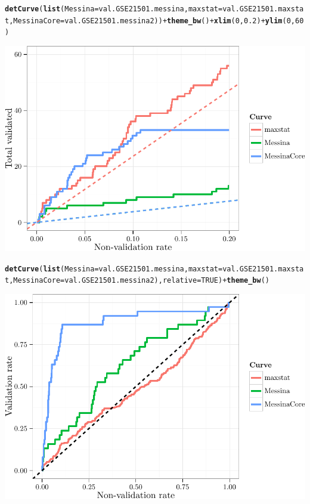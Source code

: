 \documentclass{article}\usepackage[]{graphicx}\usepackage[]{color}
\makeatletter
\def\maxwidth{ %
  \ifdim\Gin@nat@width>\linewidth
    \linewidth
  \else
    \Gin@nat@width
  \fi
}
\newcommand{\hlnum}[1]{\textcolor[rgb]{0.686,0.059,0.569}{#1}}%
\newcommand{\hlopt}[1]{\textcolor[rgb]{0,0,0}{#1}}%
\newcommand{\hlstd}[1]{\textcolor[rgb]{0.345,0.345,0.345}{#1}}%
\newcommand{\hlkwc}[1]{\textcolor[rgb]{0.333,0.667,0.333}{#1}}%
\newcommand{\hlkwd}[1]{\textcolor[rgb]{0.737,0.353,0.396}{\textbf{#1}}}%
\newenvironment{kframe}{%
 \def\at@end@of@kframe{}%
 \ifinner\ifhmode%
  \def\at@end@of@kframe{\end{minipage}}%
  \begin{minipage}{\columnwidth}%
 \fi\fi%
 \def\FrameCommand##1{\hskip\@totalleftmargin \hskip-\fboxsep
 \colorbox{shadecolor}{##1}\hskip-\fboxsep
     \hskip-\linewidth \hskip-\@totalleftmargin \hskip\columnwidth}%
 \MakeFramed {\advance\hsize-\width
   \@totalleftmargin\z@ \linewidth\hsize
   \@setminipage}}%
 {\par\unskip\endMakeFramed%
 \at@end@of@kframe}
\newenvironment{knitrout}{}{} %
\makeatother
\begin{document}
\begin{knitrout}
{}


\begin{kframe}\begin{alltt}
\hlkwd{detCurve}\hlstd{(}\hlkwd{list}\hlstd{(}\hlkwc{Messina} \hlstd{= val.GSE21501.messina,} \hlkwc{maxstat} \hlstd{= val.GSE21501.maxstat,} \hlkwc{MessinaCore} \hlstd{= val.GSE21501.messina2))} \hlopt{+} \hlkwd{theme_bw}\hlstd{()} \hlopt{+} \hlkwd{xlim}\hlstd{(}\hlnum{0}\hlstd{,} \hlnum{0.2}\hlstd{)} \hlopt{+} \hlkwd{ylim}\hlstd{(}\hlnum{0}\hlstd{,} \hlnum{60}\hlstd{)}
\end{alltt}


{\ttfamily\noindent\color{warningcolor}{\#\# Warning: Removed 6070 rows containing missing values (geom\_path).}}\end{kframe}

{\centering \includegraphics[width=\maxwidth]{figure/07-E3-E3-val-detcurves-3} 

}


\begin{kframe}\begin{alltt}
\hlkwd{detCurve}\hlstd{(}\hlkwd{list}\hlstd{(}\hlkwc{Messina} \hlstd{= val.GSE21501.messina,} \hlkwc{maxstat} \hlstd{= val.GSE21501.maxstat,} \hlkwc{MessinaCore} \hlstd{= val.GSE21501.messina2),} \hlkwc{relative} \hlstd{=} \hlnum{TRUE}\hlstd{)} \hlopt{+} \hlkwd{theme_bw}\hlstd{()}
\end{alltt}
\end{kframe}

{\centering \includegraphics[width=\maxwidth]{figure/07-E3-E3-val-detcurves-4} 

}
\end{knitrout}
\end{document}
